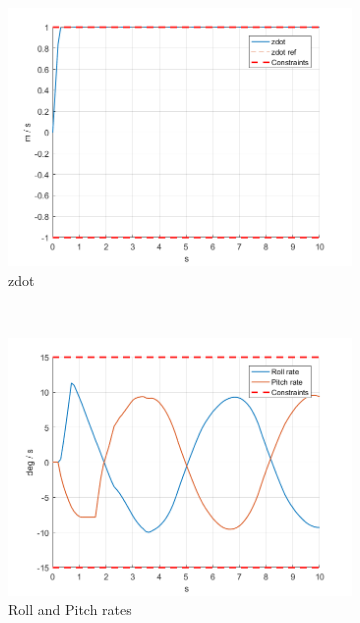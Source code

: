 \documentclass[11pt]{article}
\begin{document}
\begin{enumerate}
\begin{figure}[ht]
        \begin{subfigure}[c]{0.3\linewidth}
            \centering
            \includegraphics[width=\linewidth]{Plots_06_ReferenceTracking_Varying/04}
            \caption{zdot}
        \end{subfigure}
        ~
        \begin{subfigure}[c]{0.3\linewidth}
            \centering
            \includegraphics[width=\linewidth]{Plots_06_ReferenceTracking_Varying/05}
            \caption{Roll and Pitch rates}
        \end{subfigure}
        ~
        \begin{subfigure}[c]{0.3\linewidth}
            \centering

\end{subfigure}
\end{figure}
\end{enumerate}
\end{document}
